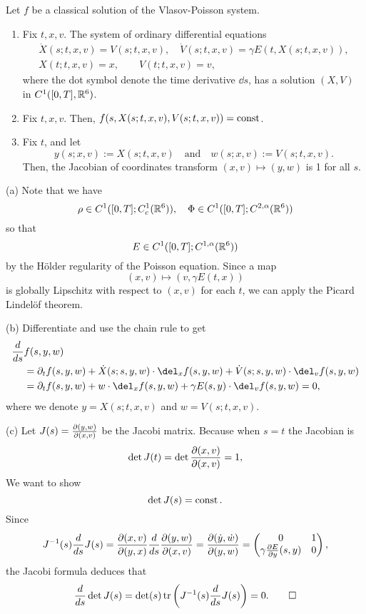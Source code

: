 \documentclass[11pt]{amsart}
\begin{document}
\begin{lem}
Let $f$ be a classical solution of the Vlasov-Poisson system.
\begin{enumerate}
\item Fix $t,x,v$. The system of ordinary differential equations
\begin{gather*}
\dot X(s;t,x,v)=V(s;t,x,v),\quad\dot V(s;t,x,v)=\gamma E(t,X(s;t,x,v)),\\
X(t;t,x,v)=x,\qquad V(t;t,x,v)=v,
\end{gather*}
where the dot symbol denote the time derivative $\dd{s}$, has a solution $(X,V)$ in $C^1([0,T],\mathbb{R}^6)$.
\item Fix $t,x,v$. Then, $f(s,X(s;t,x,v),V(s;t,x,v))=\operatorname{const}$.
\item Fix $t$, and let
\[y(s;x,v):=X(s;t,x,v)\quad\text{and}\quad w(s;x,v):=V(s;t,x,v).\]
Then, the Jacobian of coordinates transform $(x,v)\mapsto(y,w)$ is 1 for all $s$.
\end{enumerate}
\end{lem}
\begin{pf}
(a)
Note that we have
\[\rho\in C^1([0,T];C_c^1(\mathbb{R}^6)),\quad\Phi\in C^1([0,T];C^{2,\alpha}(\mathbb{R}^6))\]
so that
\[E\in C^1([0,T];C^{1,\alpha}(\mathbb{R}^6))\]
by the H\"older regularity of the Poisson equation.
Since a map
\[(x,v)\mapsto(v,\gamma E(t,x))\]
is globally Lipschitz with respect to $(x,v)$ for each $t$, we can apply the Picard Lindel\"of theorem.

(b)
Differentiate and use the chain rule to get
\begin{align*}
\dd{s}&f(s,y,w)\\
&=\pd_tf(s,y,w)+\dot X(s;s,y,w)\cdot\del_xf(s,y,w)+\dot V(s;s,y,w)\cdot\del_vf(s,y,w)\\
&=\pd_tf(s,y,w)+w\cdot\del_xf(s,y,w)+\gamma E(s,y)\cdot\del_vf(s,y,w)=0,
\end{align*}
where we denote $y=X(s;t,x,v)$ and $w=V(s;t,x,v)$.

(c)
Let $J(s)=\pd{(y,w)}{(x,v)}$ be the Jacobi matrix.
Because when $s=t$ the Jacobian is
\[\det J(t)=\det\pd{(x,v)}{(x,v)}=1,\]
We want to show
\[\det J(s)=\operatorname{const}.\]
Since
\[J^{-1}(s)\dd{s}J(s)=\pd{(x,v)}{(y,x)}\dd{s}\pd{(y,w)}{(x,v)}=\pd{(\dot y,\dot w)}{(y,w)}=\mat{0&1\\\gamma\pd{E}{y}(s,y)&0},\]
the Jacobi formula deduces that
\[\dd{s}\det J(s)=\det(s)\tr\left(J^{-1}(s)\dd{s}J(s)\right)=0.\qedhere\]
\end{pf}
\end{document}
